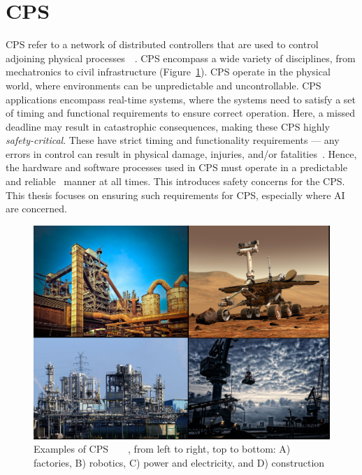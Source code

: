 \section{\acf{CPS}}
\acf{CPS} refer to a network of distributed controllers that are used to control adjoining physical processes~\cite{alur2015principles}~\cite{cps-design}. 
\ac{CPS} encompass a wide variety of disciplines, from mechatronics to civil infrastructure (Figure~\ref{fig:cps}).
\ac{CPS} operate in the physical world, where environments can be unpredictable and uncontrollable.
\ac{CPS} applications encompass real-time systems, where the systems need to satisfy a set of timing and functional requirements to ensure correct operation. 
Here, a missed deadline may result in catastrophic consequences, making these \ac{CPS} highly \textit{safety-critical}. 
These have strict timing and functionality requirements --- any errors in control can result in physical damage, injuries, and/or fatalities~\cite{ANNDevModel1999}. 
Hence, the hardware and software processes used in \ac{CPS} must operate in a predictable and reliable~\cite{reliable-cps} manner at all times.
This introduces safety concerns for the \ac{CPS}.
This thesis focuses on ensuring such requirements for \ac{CPS}, especially where \acf{AI} are concerned.

\begin{figure}[h]
	\centering
	\includegraphics[width=\textwidth]{Content/fig/1234.pdf}
	\caption{Examples of \ac{CPS}~\cite{industry-pic}~\cite{crane-pic}~\cite{rover-pic}~\cite{factory-pic}, from left to right, top to bottom: A) factories, B) robotics, C) power and electricity, and D) construction \label{fig:cps}}
\end{figure}

